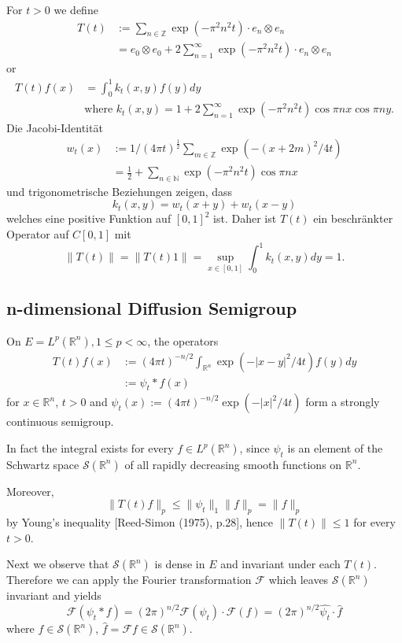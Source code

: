 For $t>0$ we define
\[
\begin{aligned}
T(t) &:= \sum_{n \in \mathbb{Z}} \exp(-\pi^2n^2t) \cdot e_{n} \otimes e_{n} \\
&= e_0 \otimes e_0 + 2\sum_{n=1}^{\infty} \exp(-\pi^2n^2t) \cdot e_{n} \otimes e_{n}
\end{aligned}
\]
or
\[
\begin{aligned}
T(t)f(x) &= \int_0^1 k_{t}(x,y)f(y)dy \\
&\text{where } k_{t}(x,y) = 1 + 2\sum_{n=1}^{\infty} \exp(-\pi^2n^2t)\cos \pi nx \cos \pi ny.
\end{aligned}
\]
Die Jacobi-Identität
\[
\begin{aligned}
w_{t}(x) &:= 1/(4\pi t)^{\frac{1}{2}} \sum_{m \in \mathbb{Z}} \exp(-(x+2m)^2/4t) \\
&= \frac{1}{2} + \sum_{n \in \mathbb{N}} \exp(-\pi^2n^2t)\cos \pi nx
\end{aligned}
\]
und trigonometrische Beziehungen zeigen, dass
\[
k_{t}(x,y) = w_{t}(x+y) + w_{t}(x-y)
\]
welches eine positive Funktion auf $[0,1]^2$ ist.
Daher ist $T(t)$ ein beschränkter Operator auf $C[0,1]$ mit
\[
\|T(t)\| = \|T(t)1\| = \sup_{x \in [0,1]} \int_0^1 k_{t}(x,y)dy = 1.
\]
\subsection{n-dimensional Diffusion Semigroup}
On $E=L^p(\mathbb{R}^n), 1 \leq p < \infty$, the operators
\[
\begin{aligned}
T(t)f(x) &:= (4\pi t)^{-n/2} \int_{\mathbb{R}^n} \exp(-|x-y|^2/4t)f(y)dy \\
&:= \psi_{t} * f(x)
\end{aligned}
\]
for $x \in \mathbb{R}^n$, $t>0$ and $\psi_{t}(x) := (4\pi t)^{-n/2}\exp(-|x|^2/4t)$ form a strongly continuous semigroup.

In fact the integral exists for every $f \in L^p(\mathbb{R}^n)$, since $\psi_{t}$ is an element of the Schwartz space $\mathcal{S}(\mathbb{R}^n)$ of all rapidly decreasing smooth functions on $\mathbb{R}^n$.

Moreover,
\[
\|T(t)f\|_{p} \leq \|\psi_{t}\|_{1}\|f\|_{p} = \|f\|_{p}
\]
by Young's inequality [Reed-Simon (1975), p.28], hence $\|T(t)\| \leq 1$ for every $t>0$.

Next we observe that $\mathcal{S}(\mathbb{R}^n)$ is dense in $E$ and invariant under each $T(t)$.
Therefore we can apply the Fourier transformation $\mathcal{F}$ which leaves $\mathcal{S}(\mathbb{R}^n)$ invariant and yields
\[
\mathcal{F}(\psi_{t} * f) = (2\pi)^{n/2}\mathcal{F}(\psi_{t}) \cdot \mathcal{F}(f) = (2\pi)^{n/2}\hat{\psi_{t}} \cdot \hat{f}
\]
where $f \in \mathcal{S}(\mathbb{R}^n)$, $\hat{f} = \mathcal{F}f \in \mathcal{S}(\mathbb{R}^n)$.

